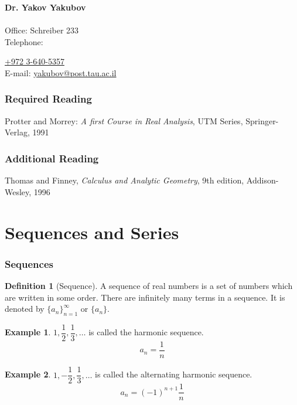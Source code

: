 \documentclass[fleqn, a4paper, 12pt, twoside]{article}
\theoremstyle{definition}
\newtheorem{example}{Example}
\newtheorem{definition}{Definition}
\theoremstyle{theorem}
\begin{document}
\textbf{Dr. Yakov Yakubov}\\
~\\
Office: Schreiber 233\\
Telephone: {\href{tel:+97236405357}{+972 3-640-5357}\\
E-mail: \href{mailto:yakubov@post.tau.ac.il}{yakubov@post.tau.ac.il}\\

\section{Required Reading}

Protter and Morrey: \textit{A first Course in Real Analysis}, UTM Series, Springer-Verlag, 1991

\section{Additional Reading}

Thomas and Finney, \textit{Calculus and Analytic Geometry}, 9th edition, Addison-Wesley, 1996

\newpage
\part{Sequences and Series}

\section{Sequences}

\begin{definition}[Sequence]
	A sequence of real numbers is a set of numbers which are written in some order. There are infinitely many terms in a sequence. It is denoted by $\{a_n\}_{n = 1}^{\infty}$ or $\{a_n\}$.
\end{definition}

\begin{example}
	$1, \dfrac{1}{2}, \dfrac{1}{3}, \dots$ is called the harmonic sequence.
	\begin{equation*}
		a_n = \dfrac{1}{n}
	\end{equation*}
\end{example}

\begin{example}
	$1, -\dfrac{1}{2}, \dfrac{1}{3}, \dots$ is called the alternating harmonic sequence.
	\begin{equation*}
		a_n = (-1)^{n + 1} \dfrac{1}{n}
	\end{equation*}
\end{example}

}
\end{document}
